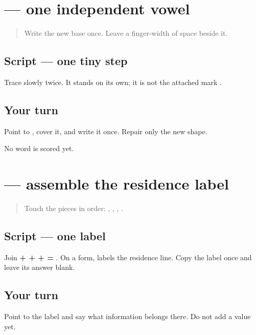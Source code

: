 \section[\texorpdfstring{\pa{ਇ} (i)}{ਇ (i)}]{ — one independent vowel}

\label{lesson:PA-W04-independent-i}



\begin{quote}
Write the new base \textbf{} once. Leave a finger-width of space beside it.
\end{quote}

\subsection*{Script — one tiny step}
Trace \textbf{} slowly twice. It stands on its own; it is not the attached mark \textbf{}.

\subsection*{Your turn}
Point to \textbf{}, cover it, and write it once. Repair only the new shape.

\begin{tcolorbox}[breakable,colback=teal!4,colframe=teal!35!black,title={Before you move on}]
No word is scored yet.
\end{tcolorbox}
\section[\texorpdfstring{\pa{ਰਿਹਾਇਸ਼} (rihāish)}{ਰਿਹਾਇਸ਼ (rihāish)}]{ — assemble the residence label}

\label{lesson:PA-W04-residence-label}



\begin{quote}
Touch the pieces in order: \textbf{}, \textbf{}, \textbf{}, \textbf{}.
\end{quote}

\subsection*{Script — one label}
Join \textbf{ +  +  +  = }. On a form, \textbf{} labels the residence line. Copy the label once and leave its answer blank.

\subsection*{Your turn}
Point to the label and say what information belongs there. Do not add a value yet.


